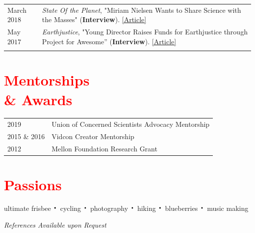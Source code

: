 \documentclass[margin, line]{res}
\newcommand*{\bigDot}{\raisebox{-0.25ex}{\scalebox{2.1}{$\cdot$}}}
\begin{document}
\begin{resume}
\begin{tabular}{@{}p{1in}p{4in}}
March $2018$ & \textit{State Of the Planet}, "Miriam Nielsen Wants to Share Science with the Masses" (\textbf{Interview}). \href{https://blogs.ei.columbia.edu/2018/03/05/miriam-nielsen-science-communications/}{[Article]}\\

May $2017$ & \textit{Earthjustice}, "Young Director Raises Funds for Earthjustice through Project for Awesome'' (\textbf{Interview}). \href{http://earthjustice.org/blog/2017-may/director-raises-funds-for-earthjustice-through-project-for-awesome}{[Article]}\\


\\
\end{tabular}



\section{\sc \textcolor{Red}{\large{Mentorships \\ \& Awards}}}
\vspace*{0.1in}
\begin{tabular}{@{}p{1in}p{4in}}
2019 & Union of Concerned Scientists Advocacy Mentorship\\
2015 \& 2016 &  Vidcon Creator Mentorship\\
2012 & Mellon Foundation Research Grant\\
\end{tabular}


\section{\sc \textcolor{Red}{\large{Passions}}}
ultimate frisbee $\bigDot$ cycling $\bigDot$ photography $\bigDot$ hiking $\bigDot$ blueberries $\bigDot$ music making


\vspace{0.21 in}

\vspace{0.3 in}
\centerline{\emph{References Available upon Request}}


\end{resume}
\end{document}
